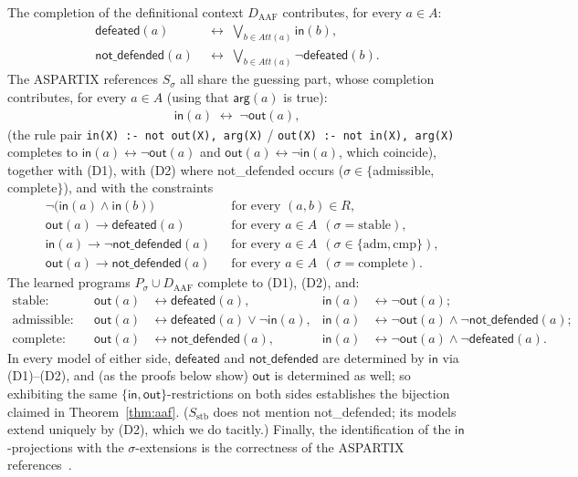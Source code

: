 \documentclass[review,12pt]{elsarticle}
\theoremstyle{definition}
\theoremstyle{remark}
\newcommand{\pred}[1]{\textsf{#1}}
\newcommand{\Daaf}{D_{\mathrm{AAF}}}
\newcommand{\Att}{\mathit{Att}}
\begin{document}
The completion of the definitional context $\Daaf$ contributes, for every
$a\in A$:
\begin{align}
\pred{defeated}(a) &\;\leftrightarrow\; \textstyle\bigvee_{b\in \Att(a)}\pred{in}(b),
\tag{D1}\\
\pred{not\_defended}(a) &\;\leftrightarrow\; \textstyle\bigvee_{b\in \Att(a)}\neg\pred{defeated}(b).
\tag{D2}
\end{align}
The ASPARTIX references $S_\sigma$ all share the guessing part, whose
completion contributes, for every $a\in A$ (using that $\pred{arg}(a)$ is
true):
\begin{align}
\pred{in}(a) \;\leftrightarrow\; \neg\pred{out}(a),
\tag{G}
\end{align}
(the rule pair \texttt{in(X) :- not out(X), arg(X)} /
\texttt{out(X) :- not in(X), arg(X)} completes to
$\pred{in}(a)\leftrightarrow\neg\pred{out}(a)$ and
$\pred{out}(a)\leftrightarrow\neg\pred{in}(a)$, which coincide), together
with (D1), with (D2) where \pred{not\_defended} occurs ($\sigma\in\{$admissible,
complete$\}$), and with the constraints
\begin{align}
&\neg\bigl(\pred{in}(a)\wedge\pred{in}(b)\bigr)
&&\text{for every }(a,b)\in R,
\tag{CF}\\
&\pred{out}(a)\rightarrow\pred{defeated}(a)
&&\text{for every }a\in A\ \ (\sigma=\text{stable}),
\tag{ST}\\
&\pred{in}(a)\rightarrow\neg\pred{not\_defended}(a)
&&\text{for every }a\in A\ \ (\sigma\in\{\text{adm},\text{cmp}\}),
\tag{AD}\\
&\pred{out}(a)\rightarrow\pred{not\_defended}(a)
&&\text{for every }a\in A\ \ (\sigma=\text{complete}).
\tag{CO}
\end{align}
The learned programs $P_\sigma\cup\Daaf$ complete to (D1), (D2), and:
\begin{align*}
\text{stable:}&&
\pred{out}(a)&\leftrightarrow\pred{defeated}(a), &
\pred{in}(a)&\leftrightarrow\neg\pred{out}(a);\\
\text{admissible:}&&
\pred{out}(a)&\leftrightarrow\pred{defeated}(a)\vee\neg\pred{in}(a), &
\pred{in}(a)&\leftrightarrow\neg\pred{out}(a)\wedge\neg\pred{not\_defended}(a);\\
\text{complete:}&&
\pred{out}(a)&\leftrightarrow\pred{not\_defended}(a), &
\pred{in}(a)&\leftrightarrow\neg\pred{out}(a)\wedge\neg\pred{defeated}(a).
\end{align*}
In every model of either side, $\pred{defeated}$ and $\pred{not\_defended}$
are determined by $\pred{in}$ via (D1)--(D2), and (as the proofs below show)
$\pred{out}$ is determined as well; so exhibiting the same
$\{\pred{in},\pred{out}\}$-restrictions on both sides establishes the
bijection claimed in Theorem~\ref{thm:aaf}. ($S_{\mathrm{stb}}$ does not
mention \pred{not\_defended}; its models extend uniquely by (D2), which we do
tacitly.) Finally, the identification of the $\pred{in}$-projections with the
$\sigma$-extensions is the correctness of the ASPARTIX
references~\citep{egly2010}.
\end{document}
